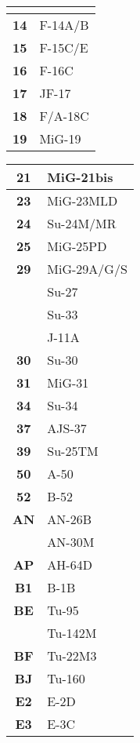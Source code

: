 \documentclass[fontSpartan]{TechCheck}
\begin{document}
\begin{multicols*}{2}
\begin{center}
\begin{tabular}{c | p{4cm} }
			\midrule
			\multicolumn{2}{c}{\blue{AIRCRAFT}} \\
			\toprule
			\textbf{14} & F-14A/B \\
			\midrule
			\textbf{15} & F-15C/E \\
			\midrule
			\textbf{16} & F-16C \\
			\midrule
			\textbf{17} & JF-17 \\
			\midrule
			\textbf{18} & F/A-18C \\
			\midrule
			\textbf{19} & MiG-19 \\
			\midrule
		\end{tabular}
	\end{center}
	\begin{center}
		\begin{tabular}{c | p{4cm}}
			\textbf{21} & MiG-21bis \\
			\midrule
			\textbf{23} & MiG-23MLD \\
			\midrule
			\textbf{24} & Su-24M/MR \\
			\midrule
			\textbf{25} & MiG-25PD \\
			\midrule
			\textbf{29} & MiG-29A/G/S \\
			& Su-27 \\
			& Su-33 \\
			& J-11A \\
			\midrule
			\textbf{30} & Su-30 \\
			\midrule
			\textbf{31} & MiG-31 \\
			\midrule
			\textbf{34} & Su-34 \\
			\midrule
			\textbf{37} & AJS-37 \\
			\midrule
			\textbf{39} & Su-25TM \\
			\midrule
			\textbf{50} & A-50 \\
			\midrule
			\textbf{52} & B-52 \\
			\midrule
			\textbf{AN} & AN-26B \\
			& AN-30M \\
			\midrule
			\textbf{AP} & AH-64D \\
			\midrule
			\textbf{B1} & B-1B \\
			\midrule
			\textbf{BE} & Tu-95 \\
			& Tu-142M \\
			\midrule
			\textbf{BF} & Tu-22M3 \\
			\midrule
			\textbf{BJ} & Tu-160 \\
			\midrule
			\textbf{E2} & E-2D \\
			\midrule
			\textbf{E3} & E-3C \\

\end{tabular}
\end{center}
\end{multicols*}
\end{document}
